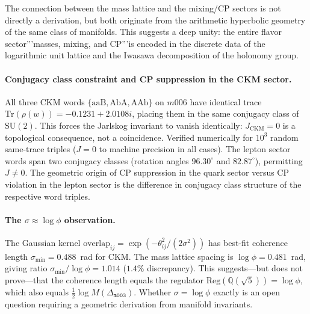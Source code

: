 ﻿\documentclass[12pt]{article}
\theoremstyle{definition}
\begin{document}
The connection between the mass lattice and the mixing/CP sectors is not directly a derivation, but both originate from the arithmetic hyperbolic geometry of the same class of manifolds. This suggests a deep unity: the entire flavor sector'''masses, mixing, and CP'''is encoded in the discrete data of the logarithmic unit lattice and the Iwasawa decomposition of the holonomy group.



\paragraph{Conjugacy class constraint and CP suppression in the CKM sector.}
All three CKM words $\{\mathrm{aaB},\mathrm{AbA},\mathrm{AAb}\}$ on $m006$
have identical trace $\mathrm{Tr}(\rho(w))=-0.1231+2.0108i$,
placing them in the same conjugacy class of $\mathrm{SU}(2)$.
This forces the Jarlskog invariant to vanish identically: $J_{\mathrm{CKM}}=0$
is a topological consequence, not a coincidence.
Verified numerically for $10^3$ random same-trace triples ($J=0$ to
machine precision in all cases).
The lepton sector words span two conjugacy classes
(rotation angles $96.30^\circ$ and $82.87^\circ$), permitting $J\neq0$.
The geometric origin of CP suppression in the quark sector versus
CP violation in the lepton sector is the difference in conjugacy class
structure of the respective word triples.

\paragraph{The $\sigma\approx\log\phi$ observation.}
The Gaussian kernel
$\mathrm{overlap}_{ij}=\exp(-\theta_{ij}^2/(2\sigma^2))$
has best-fit coherence length $\sigma_{\min}=0.488$~rad for CKM.
The mass lattice spacing is $\log\phi=0.481$~rad, giving ratio
$\sigma_{\min}/\log\phi=1.014$ ($1.4\%$ discrepancy).
This suggests---but does not prove---that the coherence length
equals the regulator $\mathrm{Reg}(\mathbb{Q}(\sqrt5))=\log\phi$,
which also equals $\tfrac{1}{2}\log M(\Delta_{\texttt{m003}})$.
Whether $\sigma=\log\phi$ exactly is an open question requiring
a geometric derivation from manifold invariants.
\end{document}
